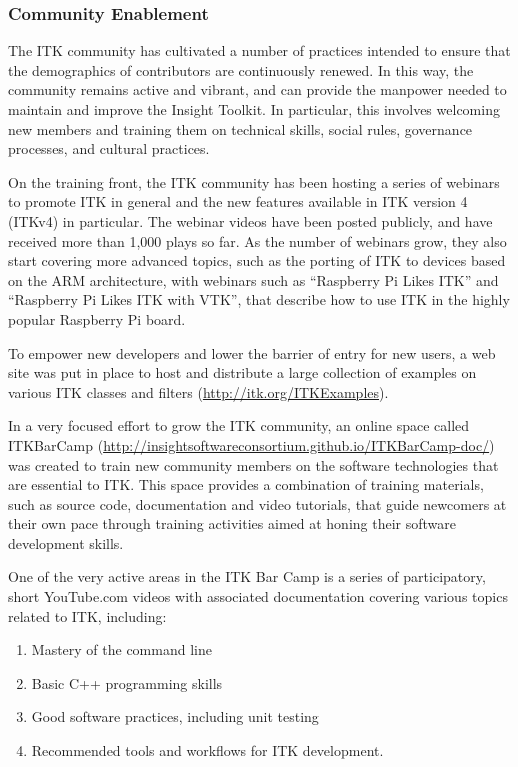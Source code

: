\documentclass{frontiersENG} %
\begin{document}
\subsubsection{Community Enablement}

The ITK community has cultivated a number of practices intended to ensure that
the demographics of contributors are continuously renewed. In this way, the
community remains active and vibrant, and can provide the manpower needed to
maintain and improve the Insight Toolkit. In particular, this involves welcoming
new members and training them on technical skills, social rules, governance
processes, and cultural practices.

On the training front, the ITK community has been hosting a series of webinars
to promote ITK in general and the new features available in ITK version 4
(ITKv4) in particular. The webinar videos have been posted publicly, and have
received more than 1,000 plays so far. As the number of webinars grow, they
also start covering more advanced topics, such as the porting of ITK to
devices based on the ARM architecture, with webinars such as ``Raspberry Pi
Likes ITK'' and ``Raspberry Pi Likes ITK with VTK'', that describe how to use
ITK in the highly popular Raspberry Pi board.

To empower new developers and lower the barrier of entry for new users, a web
site was put in place to host and distribute a large collection of examples on
various ITK classes and filters (\url{http://itk.org/ITKExamples}).

In a very focused effort to grow the ITK community, an online space called
ITKBarCamp (\url{http://insightsoftwareconsortium.github.io/ITKBarCamp-doc/})
was created to train new community members on the software technologies that
are essential to ITK. This space provides a combination of training materials,
such as source code, documentation and video tutorials, that guide newcomers at
their own pace through training activities aimed at honing their software
development skills.

One of the very active areas in the ITK Bar Camp is a series of participatory,
short YouTube.com videos with associated documentation covering various topics
related to ITK, including:
\begin{enumerate}
\item Mastery of the command line
\item Basic C++ programming skills
\item Good software practices, including unit testing
\item Recommended tools and workflows for ITK development.
\end{enumerate}
\end{document}
